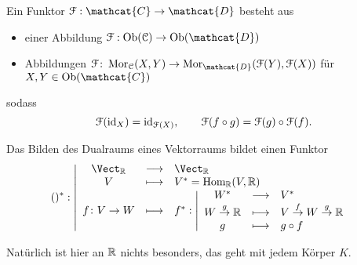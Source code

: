 \begin{definition}\label{def:kontravarianter-funktor}
   Ein  Funktor $\mathcal{F} : \mathcat{C} \to  \mathcat{D}$ besteht aus
   \begin{itemize}
       \item einer Abbildung $\mathcal{F}: \Ob(\mathcal{C}) \to  \Ob(\mathcat{D})$
       \item Abbildungen $\mathcal{F}\colon  \Mor_{\mathcal{C}}(X,Y) \to  \Mor_{\mathcat{D}}(\mathcal{F}(Y), \mathcal{F}(X))$ für $X,Y \in  \Ob(\mathcat{C})$
   \end{itemize}
   sodass
   \[
       \mathcal{F}(\operatorname{id}_X) = \operatorname{id}_{\mathcal{F}(X)}, \qquad \mathcal{F}(f \circ  g) = \mathcal{F} (g) \circ  \mathcal{F}(f)
   .\] 
\end{definition}

\begin{example}[Dualraum]
    Das Bilden des Dualraums eines Vektorraums bildet einen Funktor
        \begin{equation*}
            ()^* : \left| \begin{array}{c c l} 
        \Vect_{\R} & \longrightarrow & \Vect_{\R} \\
        V & \longmapsto &  V^*=\Hom_{\R}(V,\R) \\
        f\colon  V \to  W & \longmapsto & 
            f^*: \left| \begin{array}{c c l} 
            W^*  & \longrightarrow & V^* \\
            W\stackrel{g}{\to} \R & \longmapsto	 & V \stackrel{f}{\to }W \stackrel{g}{\to } \R \\
            g & \longmapsto & g \circ f
        \end{array} \right.
        
        \end{array} \right.
    \end{equation*}
\end{example}

\begin{remark*}
   Natürlich ist hier an $\mathbb{R}$ nichts besonders, das geht mit jedem Körper $K$. 
\end{remark*}


